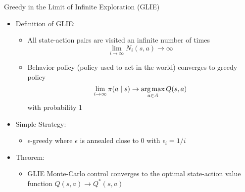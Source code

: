 \documentclass[aspectratio=169]{../latex_main/tntbeamer}  %
\begin{document}
\begin{frame}[c]{Greedy in the Limit of Infinite Exploration (GLIE)}
	
	\begin{itemize}
		\item Definition of GLIE:
		\begin{itemize}
			\item All state-action pairs are visited an infinite number of times
			$$ \lim_{i\to\infty} N_i(s,a) \to \infty$$
			\item Behavior policy (policy used to act in the world) converges to greedy
			policy
			$$\lim_{i\to \infty} \pi(a\mid s) \to \operatorname*{arg\,max}_{a\in A} Q(s,a)$$ with probability 1
		\end{itemize}
		\medskip
		\pause
		\item Simple Strategy:
		\begin{itemize}
			\item $\epsilon$-greedy where $\epsilon$ is annealed close to $0$ with $\epsilon_i = 1 / i$
		\end{itemize}
		\medskip
		\pause
		\item Theorem:
		\begin{itemize}
			\item GLIE Monte-Carlo control converges to the optimal state-action value
			function $Q(s,a) \to Q^*(s,a)$
		\end{itemize}
	\end{itemize}
	
\end{frame}
\end{document}
